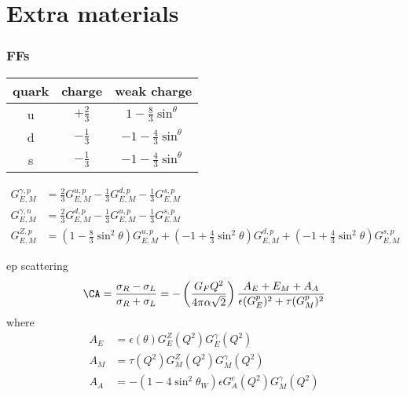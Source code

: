\section{Extra materials}

\subsubsection{FFs}
\begin{table}
    \centering
    \begin{tabular}{c | c c}
	\hline
	quark	& charge    & weak charge   \\
	\hline
	u   & $+\frac{2}{3}$	& $1 - \frac{8}{3}\sin^\theta$	\\
	d   & $-\frac{1}{3}$	& $-1 - \frac{4}{3}\sin^\theta$	\\
	s   & $-\frac{1}{3}$	& $-1 - \frac{4}{3}\sin^\theta$	\\
	\hline
    \end{tabular}
\end{table}
\begin{equation*}
    \begin{aligned}
	G_{E,M}^{\gamma,p} &= \frac{2}{3}G_{E,M}^{u,p} - \frac{1}{3}G_{E,M}^{d,p} - \frac{1}{3}G_{E,M}^{s,p} \\
	G_{E,M}^{\gamma,n} &= \frac{2}{3}G_{E,M}^{d,p} - \frac{1}{3}G_{E,M}^{u,p} - \frac{1}{3}G_{E,M}^{s,p} \\
	G_{E,M}^{Z,p} &= \left( 1 - \frac{8}{3}\sin^2\theta \right)G_{E,M}^{u,p} 
	    + \left( -1 + \frac{4}{3}\sin^2\theta \right)G_{E,M}^{d,p} 
	    + \left( -1 + \frac{4}{3}\sin^2\theta \right)G_{E,M}^{s,p} 
    \end{aligned}
\end{equation*}

ep scattering
\begin{equation*}
    \CA = \frac{\sigma_R - \sigma_L}{\sigma_R + \sigma_L} 
	= -\left( \frac{G_F Q^2}{4\pi\alpha\sqrt{2}} \right) \frac{A_E + E_M + A_A}{\epsilon(G_E^p)^2 + \tau (G_M^p)^2}
\end{equation*}
where
\begin{equation*}
    \begin{aligned}
	A_E &= \epsilon(\theta)G_E^Z(Q^2) G_E^\gamma(Q^2)   \\
	A_M &= \tau(Q^2)G_M^Z(Q^2) G_M^\gamma(Q^2)   \\
	A_A &= -(1-4\sin^2\theta_W)\epsilon G_A^e(Q^2) G_M^\gamma(Q^2)	\\
    \end{aligned}
\end{equation*}


